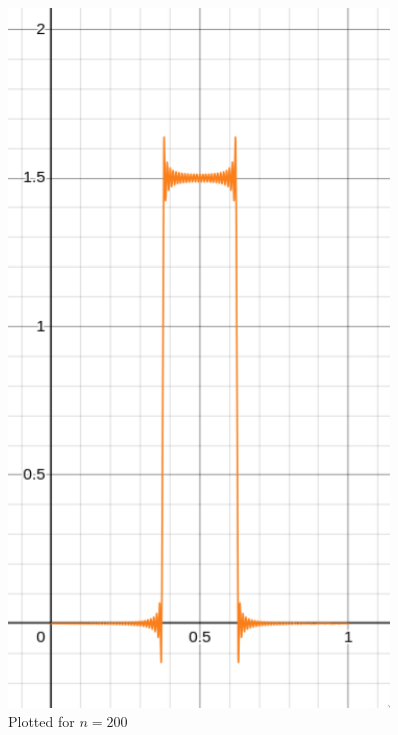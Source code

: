 \documentclass[letter]{article}
\begin{document}
\begin{minipage}{0.3\textwidth}
	\begin{figure}[H]
		\centering
		\includegraphics[width=0.9\textwidth]{ss/speed05.png}
		\caption{Plotted for $n = 200$}
		\label{fig:kdkdk}
	\end{figure}	
\end{minipage}
\hfill 
\end{document}
